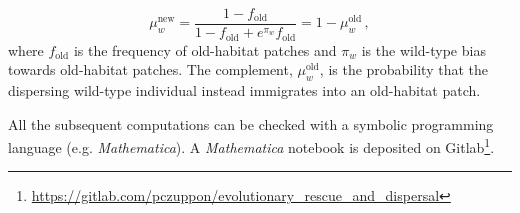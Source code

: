 \documentclass[11pt]{article}
\begin{document}
\begin{equation}\label{Seq:dispersal_rates_old}
\mu_w^{\text{new}} = \frac{1-f_{\text{old}}}{1-f_{\text{old}} + e^{\pi_w} f_{\text{old}}} = 1 - \mu_w^{\text{old}} \, ,
\end{equation}
%
where $f_{\text{old}}$ is the frequency of old-habitat patches and $\pi_w$ is the wild-type bias towards old-habitat patches. The complement, $\mu_w^{\text{old}}$, is the probability that the dispersing wild-type individual instead immigrates into an old-habitat patch. 

All the subsequent computations can be checked with a symbolic programming language (e.g. \textit{Mathematica}). A \textit{Mathematica} notebook is deposited on Gitlab\footnote{\url{https://gitlab.com/pczuppon/evolutionary\_rescue\_and\_dispersal}}.
\end{document}
